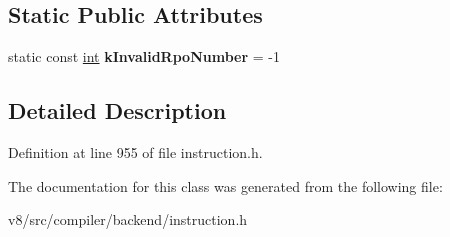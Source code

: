 \subsection*{Static Public Attributes}
\begin{DoxyCompactItemize}
\item 
\mbox{\label{classv8_1_1internal_1_1compiler_1_1RpoNumber_a836c3179486977b939b9f157a9a9ca64}} 
static const \mbox{\hyperlink{classint}{int}} {\bfseries k\+Invalid\+Rpo\+Number} = -\/1
\end{DoxyCompactItemize}


\subsection{Detailed Description}


Definition at line 955 of file instruction.\+h.



The documentation for this class was generated from the following file\+:\begin{DoxyCompactItemize}
\item 
v8/src/compiler/backend/instruction.\+h\end{DoxyCompactItemize}
